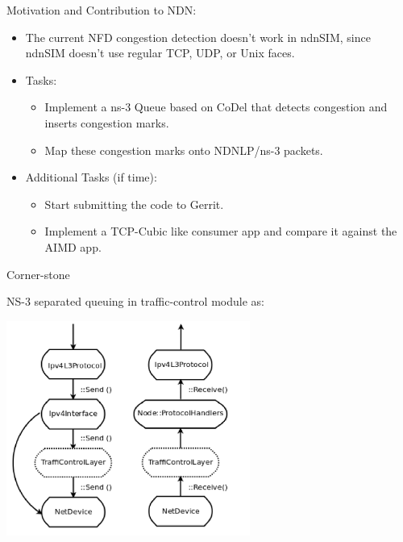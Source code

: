 



\begin{frame}{Motivation and Contribution to NDN:}
\begin{itemize}
\item The current NFD congestion detection doesn't work in ndnSIM, since ndnSIM doesn't use regular TCP, UDP, or Unix faces. 
\item Tasks: 
\begin{itemize}
\item Implement a ns-3 Queue based on CoDel that detects congestion and inserts congestion marks.
\item Map these congestion marks onto NDNLP/ns-3 packets.
\end{itemize}
\item Additional Tasks (if time):
\begin{itemize}
\item Start submitting the code to Gerrit.
\item Implement a TCP-Cubic like consumer app and compare it against the AIMD app.
\end{itemize}
\end{itemize}
\end{frame}



\begin{frame}{Corner-stone}

NS-3 separated queuing in traffic-control module as:

\includegraphics[height=200pt]{figs/ns3-queue.png}
\end{frame}


